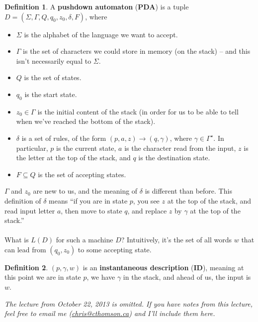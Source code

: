 \documentclass[]{article}
\theoremstyle{definition}
\newtheorem*{defn}{Definition}
\newcommand{\lecture}[1]{\marginpar{{\footnotesize $\leftarrow$ \underline{#1}}}}
\begin{document}
      \begin{defn}
        A \textbf{pushdown automaton} (\textbf{PDA}) is a tuple $D = (\Sigma, \Gamma, Q, q_0, z_0, \delta, F)$, where
        \begin{itemize}
          \item $\Sigma$ is the alphabet of the language we want to accept.
          \item $\Gamma$ is the set of characters we could store in memory (on the stack) -- and this isn't necessarily equal to $\Sigma$.
          \item $Q$ is the set of states.
          \item $q_0$ is the start state.
          \item $z_0 \in \Gamma$ is the initial content of the stack (in order for us to be able to tell when we've reached the bottom of the stack).
          \item $\delta$ is a set of rules, of the form $(p, a, z) \to (q, \gamma)$, where $\gamma \in \Gamma^\star$. In particular, $p$ is the current state, $a$ is the character read from the input, $z$ is the letter at the top of the stack, and $q$ is the destination state.
          \item $F \subseteq Q$ is the set of accepting states.
        \end{itemize}
      \end{defn}

      $\Gamma$ and $z_0$ are new to us, and the meaning of $\delta$ is different than before. This definition of $\delta$ means ``if you are in state $p$, you see $z$ at the top of the stack, and read input letter $a$, then move to state $q$, and replace $z$ by $\gamma$ at the top of the stack.''
      \\ \\
      What is $L(D)$ for such a machine $D$? Intuitively, it's the set of all words $w$ that can lead from $(q_0, z_0)$ to some accepting state.

      \begin{defn}
        $(p, \gamma, w)$ is an \textbf{instantaneous description} (\textbf{ID}), meaning at this point we are in state $p$, we have $\gamma$ in the stack, and ahead of us, the input is $w$.
      \end{defn}

      \lecture{October 22, 2013}
        \emph{The lecture from October 22, 2013 is omitted. If you have notes from this lecture, feel free to email me (\href{mailto:chris@cthomson.ca}{chris@cthomson.ca}) and I'll include them here.}
\end{document}
